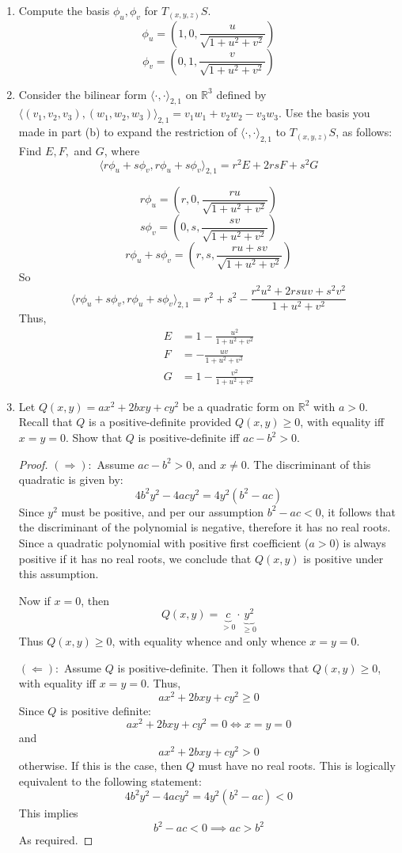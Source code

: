 \documentclass[a4paper,17pt]{extarticle}
\theoremstyle{definition}
\renewcommand{\skip}{\par\null\par}
\renewcommand{\geq}{\geqslant}
\newcommand{\R}{\mathbb{R}}
\begin{document}
\begin{enumerate}
\begin{enumerate}[label=(\alph*).]
\begin{proof}
$$\begin{pmatrix}
    Y_uQ& Y_vQ\\
    Z_uQ& Z_vQ
    \end{pmatrix}$$  $$d\phi_Q=\begin{pmatrix}1 & 0\\
    0& 1\\
    \frac{u}{\sqrt{1+u^2+v^2}} & \frac{v}{\sqrt{1+u^2+v^2}}
    \end{pmatrix}$$ Since the two columns of this matrix are linearly independent, $d\phi_Q$ is an injection, and therefore we may conclude that $S$ is a regular surface.
    \end{proof}
    \item Compute the basis $\phi_u,\phi_v$ for $T_{(x,y,z)}S$. $$\phi_u=(1,0,\frac{u}{\sqrt{1+u^2+v^2}})$$ $$\phi_v=(0,1,\frac{v}{\sqrt{1+u^2+v^2}})$$
    \item Consider the bilinear form $\langle\cdot,\cdot\rangle_{2,1}$ on $\R^3$ defined by $\langle(v_1,v_2,v_3),(w_1,w_2,w_3)\rangle_{2,1}=v_1w_1+v_2w_2-v_3w_3$. Use the basis you made in part (b) to expand the restriction of $\langle\cdot,\cdot\rangle_{2,1}$ to $T_{(x,y,z)}S$, as follows: Find $E,F,$ and $G$, where $$\langle r\phi_u+s\phi_v,r\phi_u+s\phi_v\rangle_{2,1}=r^2E+2rsF+s^2G$$ \skip $$r\phi_u=(r,0,\frac{ru}{\sqrt{1+u^2+v^2}})$$ $$s\phi_v=(0,s,\frac{sv}{\sqrt{1+u^2+v^2}})$$ $$r\phi_u+s\phi_v=(r,s,\frac{ru+sv}{\sqrt{1+u^2+v^2}})$$ So $$\langle r\phi_u+s\phi_v,r\phi_u+s\phi_v\rangle_{2,1}=r^2+s^2-\frac{r^2u^2+2rsuv+s^2v^2}{1+u^2+v^2}$$ Thus, \begin{align*}
        E&=1-\frac{u^2}{1+u^2+v^2}\\ F&=-\frac{uv}{1+u^2+v^2}\\ G&=1-\frac{v^2}{1+u^2+v^2}
    \end{align*}
    \item Let $Q(x,y)=ax^2+2bxy+cy^2$ be a quadratic form on $\R^2$ with $a>0$. Recall that $Q$ is a positive-definite provided $Q(x,y)\geq0$, with equality iff $x=y=0$. Show that $Q$ is positive-definite iff $ac-b^2>0$.\begin{proof}$(\Longrightarrow):$ Assume $ac-b^2>0$, and $x\neq0$. The discriminant of this quadratic is given by: $$4b^2y^2-4acy^2=4y^2(b^2-ac)$$ Since $y^2$ must be positive, and per our assumption $b^2-ac<0$, it follows that the discriminant of the polynomial is negative, therefore it has no real roots. Since a quadratic polynomial with positive first coefficient ($a>0$) is always positive if it has no real roots, we conclude that $Q(x,y)$ is positive under this assumption.\skip Now if $x=0$, then $$Q(x,y)=\underbrace{c}_{>0}\cdot\underbrace{y^2}_{\geq0}$$ Thus $Q(x,y)\geq0$, with equality whence and only whence $x=y=0$.\skip $(\Longleftarrow):$ Assume $Q$ is positive-definite. Then it follows that $Q(x,y)\geq0$, with equality iff $x=y=0$. Thus, $$ax^2+2bxy+cy^2\geq0$$ Since $Q$ is positive definite: $$ax^2+2bxy+cy^2=0\Longleftrightarrow x=y=0$$ and $$ax^2+2bxy+cy^2>0$$ otherwise. If this is the case, then $Q$ must have no real roots. This is logically equivalent to the following statement: $$4b^2y^2-4acy^2=4y^2(b^2-ac)<0$$ This implies $$b^2-ac<0\implies ac>b^2$$ As required.

\end{proof}
\end{enumerate}
\end{enumerate}
\end{document}
